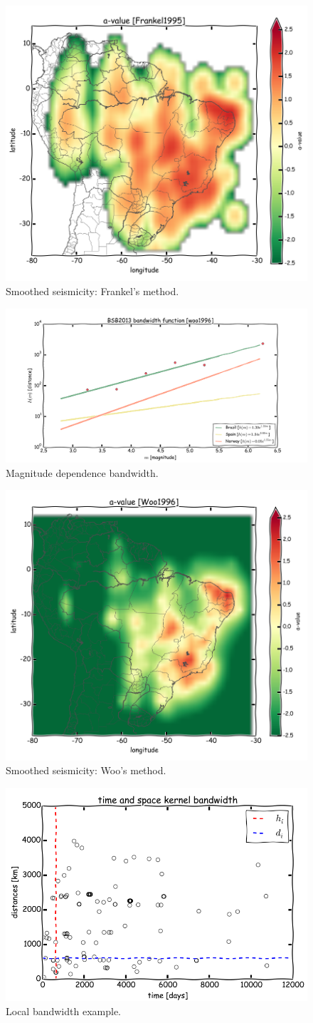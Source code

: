 \documentclass[draft, grl]{agutex}
\begin{document}

\begin{figure}
	\includegraphics[width=0.4\linewidth]{z_img_a_frankel_br}
	\caption{Smoothed seismicity: Frankel's method.}
	\label{fig_a_frankel}
\end{figure}


\begin{figure}
	\includegraphics[width=0.4\linewidth]{z_img_woo_bandwidth}
	\caption{Magnitude dependence bandwidth.}
	\label{fig_woo_bandwidth}
\end{figure}


\begin{figure}
	\includegraphics[width=0.4\linewidth]{z_img_a_woo}
	\caption{Smoothed seismicity: Woo's method.}
	\label{fig_a_woo}
\end{figure}


\begin{figure}
	\includegraphics[width=0.4\linewidth]{z_img_helmstetter_hidi}
	\caption{Local bandwidth example.}
	\label{fig_helmstetter_hidi}
\end{figure}
\end{document}
